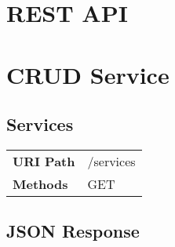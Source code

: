 \section{REST API}

\section{CRUD Service}
\subsection{Services}
\begin{tabularx}{\linewidth}{l l}
\textbf{URI Path} & /services\\
\textbf{Methods} & GET\\
\end{tabularx}

\subsection{JSON Response}

